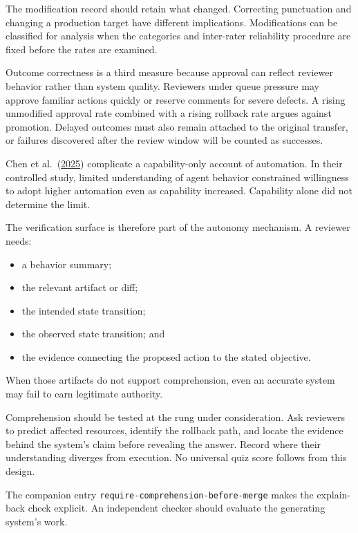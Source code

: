 The modification record should retain what changed. Correcting punctuation and changing a production target have different implications. Modifications can be classified for analysis when the categories and inter-rater reliability procedure are fixed before the rates are examined.

Outcome correctness is a third measure because approval can reflect reviewer behavior rather than system quality. Reviewers under queue pressure may approve familiar actions quickly or reserve comments for severe defects. A rising unmodified approval rate combined with a rising rollback rate argues against promotion. Delayed outcomes must also remain attached to the original transfer, or failures discovered after the review window will be counted as successes.

Chen et al.~(\href{https://arxiv.org/abs/2507.08149}{2025}) complicate a capability-only account of automation. In their controlled study, limited understanding of agent behavior constrained willingness to adopt higher automation even as capability increased. Capability alone did not determine the limit.


The verification surface is therefore part of the autonomy mechanism. A reviewer needs:

\begin{itemize}
\tightlist
\item
  a behavior summary;
\item
  the relevant artifact or diff;
\item
  the intended state transition;
\item
  the observed state transition; and
\item
  the evidence connecting the proposed action to the stated objective.
\end{itemize}

When those artifacts do not support comprehension, even an accurate system may fail to earn legitimate authority.

Comprehension should be tested at the rung under consideration. Ask reviewers to predict affected resources, identify the rollback path, and locate the evidence behind the system's claim before revealing the answer. Record where their understanding diverges from execution. No universal quiz score follows from this design.

The companion entry \texttt{require-comprehension-before-merge} makes the explain-back check explicit. An independent checker should evaluate the generating system's work.

